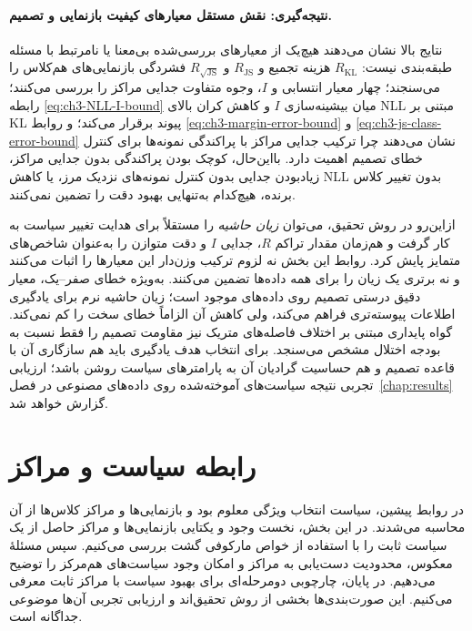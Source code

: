 \paragraph{نتیجه‌گیری: نقش مستقل معیارهای کیفیت بازنمایی و تصمیم.}
نتایج بالا نشان می‌دهند هیچ‌یک از معیارهای بررسی‌شده
بی‌معنا یا نامرتبط با مسئله طبقه‌بندی نیست:
$R_{\mathrm{KL}}$ هزینه تجمیع و
$R_{\mathrm{JS}}$ و $R_{\sqrt{\mathrm{JS}}}$
فشردگی بازنمایی‌های هم‌کلاس را می‌سنجند؛
چهار معیار انتسابی و $I$، وجوه متفاوت جدایی
مراکز را بررسی می‌کنند؛ رابطه
\eqref{eq:ch3-NLL-I-bound} میان بیشینه‌سازی
$I$ و کاهش کران بالای NLL مبتنی بر KL
پیوند برقرار می‌کند؛ و روابط
\eqref{eq:ch3-margin-error-bound} و
\eqref{eq:ch3-js-class-error-bound}
نشان می‌دهند چرا ترکیب جدایی مراکز با
پراکندگی نمونه‌ها برای کنترل خطای تصمیم
اهمیت دارد. بااین‌حال، کوچک بودن پراکندگی
بدون جدایی مراکز، زیادبودن جدایی بدون کنترل
نمونه‌های نزدیک مرز، یا کاهش NLL بدون
تغییر کلاس برنده، هیچ‌کدام به‌تنهایی
بهبود دقت را تضمین نمی‌کنند.

ازاین‌رو در روش تحقیق، می‌توان
\emph{زیان حاشیه} را مستقلاً برای
هدایت تغییر سیاست به کار گرفت و
هم‌زمان مقدار تراکم $R$،
جدایی $I$ و دقت متوازن را
به‌عنوان شاخص‌های متمایز پایش کرد.
روابط این بخش نه لزوم ترکیب
وزن‌دار این معیارها را اثبات
می‌کنند و نه برتری یک زیان را
برای همه داده‌ها تضمین می‌کنند.
به‌ویژه خطای صفر--یک، معیار دقیق
درستی تصمیم روی داده‌های موجود است؛
زیان حاشیه نرم برای یادگیری
اطلاعات پیوسته‌تری فراهم می‌کند،
ولی کاهش آن الزاماً خطای سخت را
کم نمی‌کند. گواه پایداری مبتنی
بر اختلاف فاصله‌های متریک نیز
مقاومت تصمیم را فقط نسبت به
بودجه اختلال مشخص می‌سنجد.
برای انتخاب هدف یادگیری باید
هم سازگاری آن با قاعده تصمیم
و هم حساسیت گرادیان آن به
پارامترهای سیاست روشن باشد؛
ارزیابی تجربی نتیجه سیاست‌های
آموخته‌شده روی داده‌های مصنوعی
در فصل~\ref{chap:results}
گزارش خواهد شد.




\section{رابطه سیاست و مراکز}
\label{sec:ch3-inverse-center-policy}
در روابط پیشین، سیاست انتخاب ویژگی معلوم بود و بازنمایی‌ها و مراکز کلاس‌ها از آن محاسبه می‌شدند. در این بخش، نخست وجود و یکتایی بازنمایی‌ها و مراکز حاصل از یک سیاست ثابت را با استفاده از خواص مارکوفی گشت بررسی می‌کنیم. سپس مسئلهٔ معکوس، محدودیت دست‌یابی به مراکز و امکان وجود سیاست‌های هم‌مرکز را توضیح می‌دهیم. در پایان، چارچوبی دومرحله‌ای برای بهبود سیاست با مراکز ثابت معرفی می‌کنیم. این صورت‌بندی‌ها بخشی از روش تحقیق‌اند و ارزیابی تجربی آن‌ها موضوعی جداگانه است.

